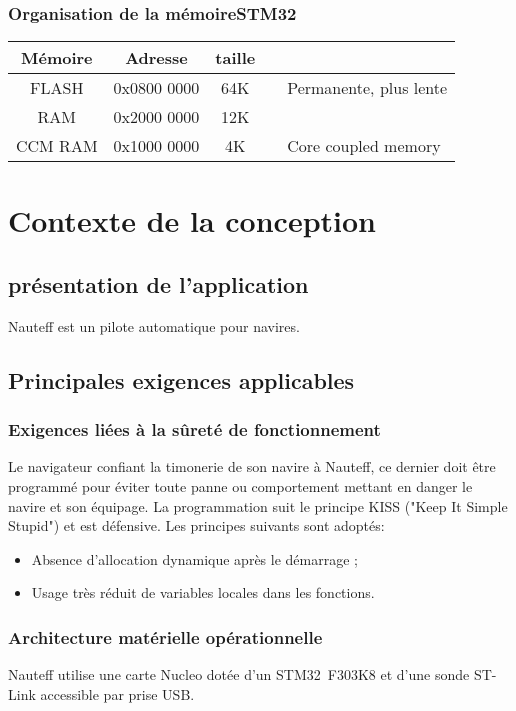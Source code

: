 \documentclass[a4paper,11pt]{report}
\begin{document}
\subsection{Organisation de la mémoireSTM32}

\begin{tabular}{|c|c|c|c|p{5cm}|}
	\hline 
	Mémoire & Adresse     & taille &  &  \\ 
	\hline 
	FLASH   & 0x0800 0000 & 64K &  &  Permanente, plus lente \\ 
	RAM     & 0x2000 0000 & 12K &  &  \\ 
	CCM RAM & 0x1000 0000 &  4K &  &  Core coupled memory\\ 
	\hline
\end{tabular}

\chapter{Contexte de la conception}
\section{présentation de l'application}
Nauteff est un pilote automatique pour navires.
\section{Principales exigences applicables}
\subsection{Exigences liées à la sûreté de fonctionnement}
Le navigateur confiant la timonerie de son navire à Nauteff,
ce dernier doit être programmé pour éviter toute panne ou
comportement mettant en danger le navire et son équipage.
La programmation suit le principe KISS ("Keep It Simple Stupid")
et est défensive.
Les principes suivants sont adoptés:
\begin{itemize}
	\item Absence d'allocation dynamique après le démarrage ;
	\item Usage très réduit de variables locales dans les fonctions.
\end{itemize}


\subsection{Architecture matérielle opérationnelle}
Nauteff utilise une carte Nucleo dotée d'un STM32~F303K8
et d'une sonde ST-Link accessible par prise USB.
\end{document}
